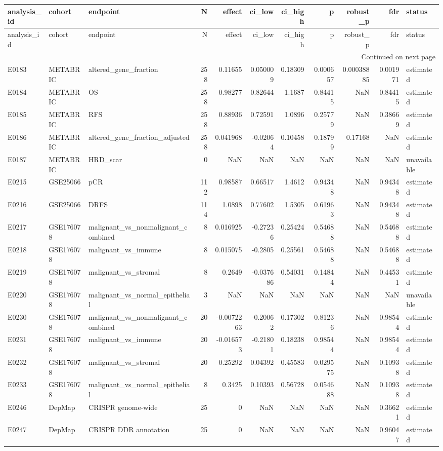 \begin{longtable}{lllrrrrrrrl}
\toprule
analysis\_id & cohort & endpoint & N & effect & ci\_low & ci\_high & p & robust\_p & fdr & status \\
\midrule
\endfirsthead
\toprule
analysis\_id & cohort & endpoint & N & effect & ci\_low & ci\_high & p & robust\_p & fdr & status \\
\midrule
\endhead
\midrule
\multicolumn{11}{r}{Continued on next page} \\
\midrule
\endfoot
\bottomrule
\endlastfoot
E0183 & METABRIC & altered\_gene\_fraction & 258 & 0.11655 & 0.050009 & 0.18309 & 0.000657 & 0.00038885 & 0.001971 & estimated \\
E0184 & METABRIC & OS & 258 & 0.98277 & 0.82644 & 1.1687 & 0.84415 & NaN & 0.84415 & estimated \\
E0185 & METABRIC & RFS & 258 & 0.88936 & 0.72591 & 1.0896 & 0.25779 & NaN & 0.38669 & estimated \\
E0186 & METABRIC & altered\_gene\_fraction\_adjusted & 258 & 0.041968 & -0.02064 & 0.10458 & 0.18799 & 0.17168 & NaN & estimated \\
E0187 & METABRIC & HRD\_scar & 0 & NaN & NaN & NaN & NaN & NaN & NaN & unavailable \\
E0215 & GSE25066 & pCR & 112 & 0.98587 & 0.66517 & 1.4612 & 0.94348 & NaN & 0.94348 & estimated \\
E0216 & GSE25066 & DRFS & 114 & 1.0898 & 0.77602 & 1.5305 & 0.61963 & NaN & 0.94348 & estimated \\
E0217 & GSE176078 & malignant\_vs\_nonmalignant\_combined & 8 & 0.016925 & -0.27236 & 0.25424 & 0.54688 & NaN & 0.54688 & estimated \\
E0218 & GSE176078 & malignant\_vs\_immune & 8 & 0.015075 & -0.2805 & 0.25561 & 0.54688 & NaN & 0.54688 & estimated \\
E0219 & GSE176078 & malignant\_vs\_stromal & 8 & 0.2649 & -0.037686 & 0.54031 & 0.14844 & NaN & 0.44531 & estimated \\
E0220 & GSE176078 & malignant\_vs\_normal\_epithelial & 3 & NaN & NaN & NaN & NaN & NaN & NaN & unavailable \\
E0230 & GSE176078 & malignant\_vs\_nonmalignant\_combined & 20 & -0.0072263 & -0.20062 & 0.17302 & 0.81236 & NaN & 0.98544 & estimated \\
E0231 & GSE176078 & malignant\_vs\_immune & 20 & -0.016573 & -0.21801 & 0.18238 & 0.98544 & NaN & 0.98544 & estimated \\
E0232 & GSE176078 & malignant\_vs\_stromal & 20 & 0.25292 & 0.04392 & 0.45583 & 0.029575 & NaN & 0.10938 & estimated \\
E0233 & GSE176078 & malignant\_vs\_normal\_epithelial & 8 & 0.3425 & 0.10393 & 0.56728 & 0.054688 & NaN & 0.10938 & estimated \\
E0246 & DepMap & CRISPR genome-wide & 25 & 0 & NaN & NaN & NaN & NaN & 0.36621 & estimated \\
E0247 & DepMap & CRISPR DDR annotation & 25 & 0 & NaN & NaN & NaN & NaN & 0.96047 & estimated \\
\end{longtable}
